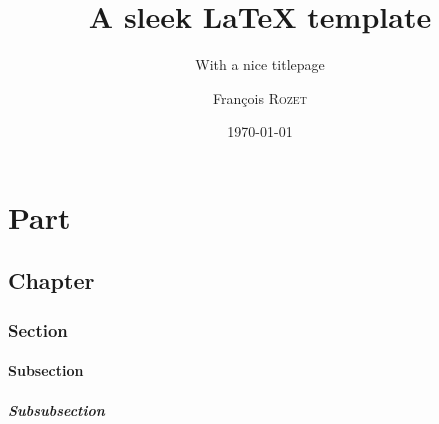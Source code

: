 \documentclass[a4paper, 12pt]{report}
\institute{Random University}
\title{A sleek \LaTeX{} template}
\subtitle{With a nice titlepage}
\author{François \textsc{Rozet}}
\date{\today}
\begin{document}
    \maketitle
    \romantableofcontents

    \part{Part}
    \chapter{Chapter}
    \section{Section}
    \subsection{Subsection}
    \subsubsection{Subsubsection}

    \nocite{einstein}
    \nocite{knuthwebsite}
    \printbibliography
\end{document}

